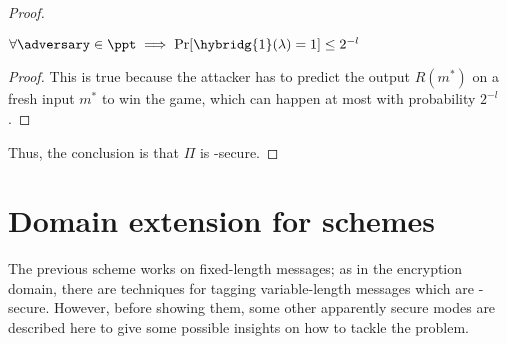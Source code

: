 \begin{proof}
\begin{cryptoredux}
        \cseqbeginloop
        \cseqendloop

        \cseqdelay
    

        \cseqdelay

        
    \end{cryptoredux}

    \begin{lemma}
        $\forall \adversary \in \ppt \implies \Pr[\hybridg{1}(\lambda) = 1] \leq 2^{-l}$
    \end{lemma}

    \begin{proof}
        This is true because the attacker has to predict the output $R(m^*)$ on a fresh input $m^*$ to win the game, which can happen at most with probability $2^{-l}$.
    \end{proof}

    Thus, the conclusion is that $\Pi$ is \ufcma-secure.
\end{proof}


\section{Domain extension for \mac{} schemes}

The previous scheme works on fixed-length messages; as in the encryption domain, there are techniques for tagging variable-length messages which are \ufcma-secure. However, before showing them, some other apparently secure modes are described here to give some possible insights on how to tackle the problem. 

